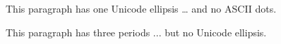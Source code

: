 This paragraph has one Unicode ellipsis … and no ASCII dots.

This paragraph has three periods ... but no Unicode ellipsis.

